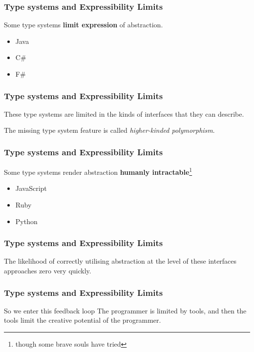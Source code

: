 \begin{frame}
\frametitle{Type systems and Expressibility Limits}
\begin{block}{Some type systems \textbf{limit expression} of abstraction.}
\begin{itemize}
\item Java
\item C\#
\item F\#
\end{itemize}
\end{block}
\end{frame}

\begin{frame}
\frametitle{Type systems and Expressibility Limits}
\begin{center}
These type systems are limited in the kinds of interfaces that they can describe.
\end{center}
\begin{center}
The missing type system feature is called \emph{higher-kinded polymorphism}.
\end{center}
\end{frame}

\begin{frame}
\frametitle{Type systems and Expressibility Limits}
\begin{block}{Some type systems render abstraction \textbf{humanly intractable}}\footnote{though some brave souls have tried}
\begin{itemize}
\item JavaScript
\item Ruby
\item Python
\end{itemize}
\end{block}
\end{frame}

\begin{frame}
\frametitle{Type systems and Expressibility Limits}
\begin{center}
The likelihood of correctly utilising abstraction at the level of these interfaces approaches zero very quickly.
\end{center}
\end{frame}

\begin{frame}
\frametitle{Type systems and Expressibility Limits}
\begin{block}{So we enter this feedback loop}
The programmer is limited by tools, and then the tools limit the creative potential of the programmer.
\end{block}
\end{frame}

